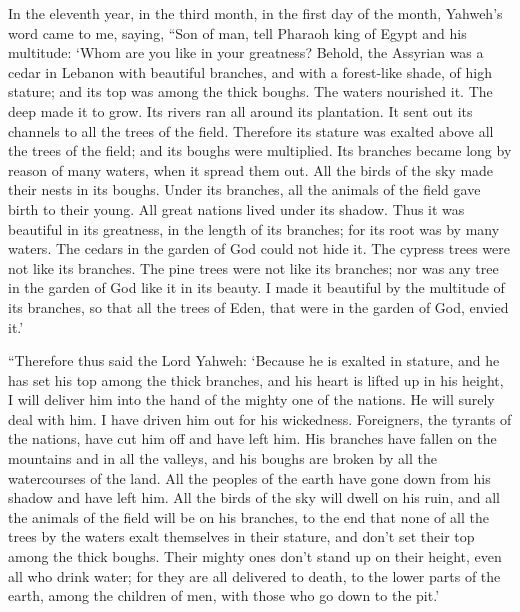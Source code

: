  In the eleventh year, in the third month, in the first
day of the month, Yahweh's word came to me, saying,  ``Son
of man, tell Pharaoh king of Egypt and his multitude: `Whom are you like
in your greatness?  Behold, the Assyrian was a cedar in
Lebanon with beautiful branches, and with a forest-like shade, of high
stature; and its top was among the thick boughs.  The
waters nourished it. The deep made it to grow. Its rivers ran all around
its plantation. It sent out its channels to all the trees of the field.
 Therefore its stature was exalted above all the trees of
the field; and its boughs were multiplied. Its branches became long by
reason of many waters, when it spread them out.  All the
birds of the sky made their nests in its boughs. Under its branches, all
the animals of the field gave birth to their young. All great nations
lived under its shadow.  Thus it was beautiful in its
greatness, in the length of its branches; for its root was by many
waters.  The cedars in the garden of God could not hide
it. The cypress trees were not like its branches. The pine trees were
not like its branches; nor was any tree in the garden of God like it in
its beauty.  I made it beautiful by the multitude of its
branches, so that all the trees of Eden, that were in the garden of God,
envied it.'

 ``Therefore thus said the Lord Yahweh: `Because he is
exalted in stature, and he has set his top among the thick branches, and
his heart is lifted up in his height,  I will deliver him
into the hand of the mighty one of the nations. He will surely deal with
him. I have driven him out for his wickedness. 
Foreigners, the tyrants of the nations, have cut him off and have left
him. His branches have fallen on the mountains and in all the valleys,
and his boughs are broken by all the watercourses of the land. All the
peoples of the earth have gone down from his shadow and have left him.
 All the birds of the sky will dwell on his ruin, and all
the animals of the field will be on his branches,  to the
end that none of all the trees by the waters exalt themselves in their
stature, and don't set their top among the thick boughs. Their mighty
ones don't stand up on their height, even all who drink water; for they
are all delivered to death, to the lower parts of the earth, among the
children of men, with those who go down to the pit.'

